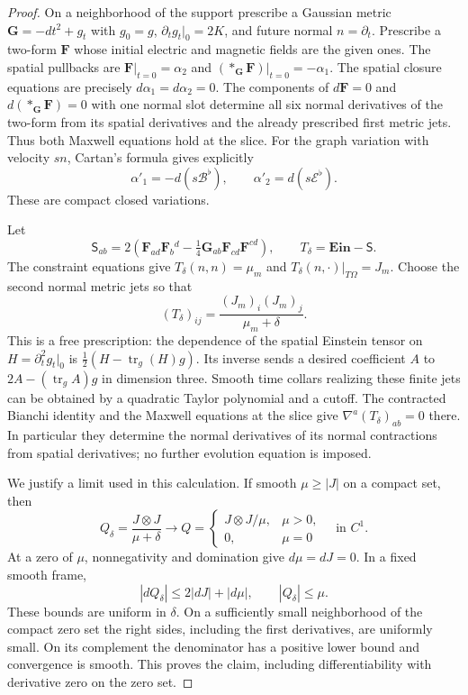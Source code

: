 \begin{proof}
On a neighborhood of the support prescribe a Gaussian metric
\(\mathbf G=-dt^2+g_t\) with \(g_0=g\), \(\partial_tg_t|_0=2K\),
and future normal \(n=\partial_t\).  Prescribe a two-form \(\mathbf F\)
whose initial electric and magnetic fields are the given ones.  The
spatial pullbacks are
\(\mathbf F|_{t=0}=\alpha_2\) and
\((*_{\mathbf G}\mathbf F)|_{t=0}=-\alpha_1\).
The spatial closure equations are precisely \(d\alpha_1=d\alpha_2=0\).
The components of \(d\mathbf F=0\) and
\(d(*_{\mathbf G}\mathbf F)=0\) with one normal slot determine all six
normal derivatives of the two-form from its spatial derivatives and the
already prescribed first metric jets.  Thus both Maxwell equations hold
at the slice.  For the graph variation with velocity \(sn\), Cartan's
formula gives explicitly
\begin{equation}\label{va:lapse-flux-variation}
 \alpha'_1=-d(s\mathcal B^\flat),\qquad
 \alpha'_2=d(s\mathcal E^\flat).
\end{equation}
These are compact closed variations.

Let
\begin{equation}\label{va:maxwell-stress}
 \mathsf S_{ab}=2\left(\mathbf F_{ad}\mathbf F_b{}^d
            -\tfrac14\mathbf G_{ab}\mathbf F_{cd}\mathbf F^{cd}\right),
 \qquad T_\delta=\mathbf{Ein}-\mathsf S.
\end{equation}
The constraint equations give
\(T_\delta(n,n)=\mu_m\) and
\(T_\delta(n,\cdot)|_{T\Omega}=J_m\).
Choose the second normal metric jets so that
\begin{equation}\label{va:regularized-stress}
 (T_\delta)_{ij}=\frac{(J_m)_i(J_m)_j}{\mu_m+\delta}.
\end{equation}
This is a free prescription: the dependence of the spatial Einstein
tensor on \(H=\partial_t^2g_t|_0\) is
\(\tfrac12(H-\operatorname{tr}_g(H)g)\).  Its inverse sends a desired
coefficient \(A\) to \(2A-(\operatorname{tr}_gA)g\) in dimension
three.  Smooth time collars realizing these finite jets can be obtained
by a quadratic Taylor polynomial and a cutoff.  The contracted Bianchi
identity and the Maxwell equations at the slice give
\(\nabla^a(T_\delta)_{ab}=0\) there.  In particular they determine the
normal derivatives of its normal contractions from spatial derivatives;
no further evolution equation is imposed.

We justify a limit used in this calculation.  If smooth \(\mu\ge|J|\)
on a compact set, then
\[
 Q_\delta=\frac{J\otimes J}{\mu+\delta}
 \longrightarrow
 Q=\begin{cases}J\otimes J/\mu,&\mu>0,\\0,&\mu=0\end{cases}
 \quad\text{in }C^1.
\]
At a zero of \(\mu\), nonnegativity and domination give
\(d\mu=dJ=0\).  In a fixed smooth frame,
\[
 |dQ_\delta|\le2|dJ|+|d\mu|,\qquad |Q_\delta|\le\mu.
\]
These bounds are uniform in \(\delta\).  On a sufficiently small
neighborhood of the compact zero set the right sides, including the
first derivatives, are uniformly small.  On its complement the
denominator has a positive lower bound and convergence is smooth.
This proves the claim, including differentiability with derivative zero
on the zero set.


\end{proof}
